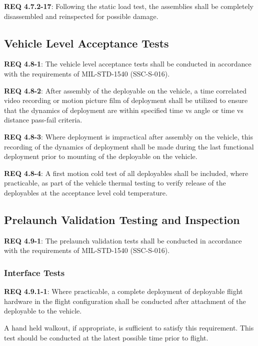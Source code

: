 \documentclass[12pt]{article}
\begin{document}
\noindent \textbf{REQ 4.7.2-17}: Following the static load test, the assemblies shall be completely disassembled and reinspected for possible damage.


\subsection{Vehicle Level Acceptance Tests} %

\noindent \textbf{REQ 4.8-1}: The vehicle level acceptance tests shall be conducted in accordance with the requirements of MIL-STD-1540 (SSC-S-016). 

\noindent \textbf{REQ 4.8-2}: After assembly of the deployable on the vehicle, a time correlated video recording or motion picture film of deployment shall be utilized to ensure that the dynamics of deployment are within specified time vs angle or time vs distance pass-fail criteria. 

\noindent \textbf{REQ 4.8-3}: Where deployment is impractical after assembly on the vehicle, this recording of the dynamics of deployment shall be made during the last functional deployment prior to mounting of the deployable on the vehicle. 

\noindent \textbf{REQ 4.8-4}: A first motion cold test of all deployables shall be included, where practicable, as part of the vehicle thermal testing to verify release of the deployables at the acceptance level cold temperature.


\subsection{Prelaunch Validation Testing and Inspection} %
\noindent \textbf{REQ 4.9-1}: The prelaunch validation tests shall be conducted in accordance with the requirements of MIL-STD-1540 (SSC-S-016).


\subsubsection{Interface Tests} %
\noindent \textbf{REQ 4.9.1-1}: Where practicable, a complete deployment of deployable flight hardware in the flight configuration shall be conducted after attachment of the deployable to the vehicle. 

A hand held walkout, if appropriate, is sufficient to satisfy this requirement. 
This test should be conducted at the latest possible time prior to flight. 
\end{document}
